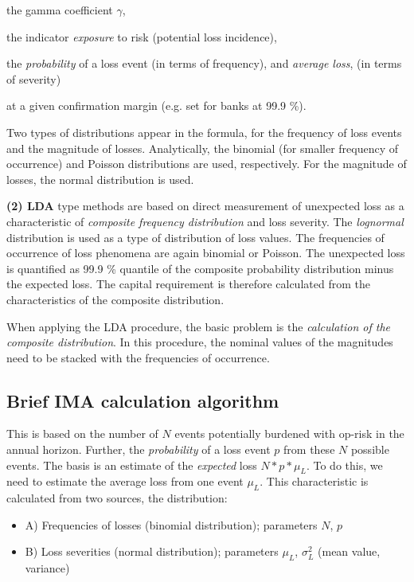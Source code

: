 \documentclass{article}
\begin{document}
\begin{compactitem}
    \item the gamma coefficient $\gamma$,
    \item the indicator \emph{exposure} to risk (potential loss incidence),
    \item the \emph{probability} of a loss event (in terms of frequency), and
    \emph{average loss}, (in terms of severity)
\end{compactitem}

at a given confirmation margin (e.g. set for banks at 99.9 \%).

Two types of distributions appear in the formula, for the frequency of loss events and the magnitude of losses. Analytically, the binomial (for smaller frequency of occurrence) and Poisson distributions are used, respectively.  For the magnitude of losses, the normal distribution is used.

\textbf{(2) LDA} type methods are based on direct measurement of unexpected loss as a characteristic of \emph{composite frequency distribution} and loss severity. The \emph{lognormal} distribution is used as a type of distribution of loss values. The frequencies of occurrence of loss phenomena are again binomial or Poisson. The unexpected loss is quantified as 99.9 \% quantile of the composite probability distribution minus the expected loss. The capital requirement is therefore calculated from the characteristics of the composite distribution.

When applying the LDA procedure, the basic problem is the \emph{calculation of the composite distribution}. In this procedure, the nominal values of the magnitudes need to be stacked with the frequencies of occurrence.


\subsection{Brief IMA calculation algorithm}

This is based on the number of $N$ events potentially burdened with op-risk in the annual horizon. Further, the \emph{probability} of a loss event $p$ from these $N$ possible events.
The basis is an estimate of the \emph{expected} loss $N * p * \mu_L$. To do this, we need to estimate the average loss from one event $\mu_L$. This characteristic is calculated from two sources, the distribution:

\begin{itemize}
  \item A) Frequencies of losses (binomial distribution); parameters $N$, $p$
  \item B) Loss severities (normal distribution); parameters $\mu_L$, $\sigma_L^2$ (mean value, variance)
\end{itemize}
\end{document}
